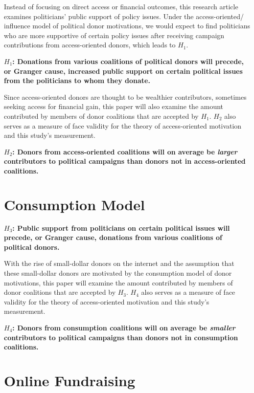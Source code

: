 \documentclass[12pt,]{article}
\begin{document}
Instead of focusing on direct access or financial outcomes, this
research article examines politicians' public support of policy issues.
Under the access-oriented/ influence model of political donor
motivations, we would expect to find politicians who are more supportive
of certain policy issues after receiving campaign contributions from
access-oriented donors, which leads to \(H_{1}\).

\textbf{\(H_{1}\): Donations from various coalitions of political donors
will precede, or Granger cause, increased public support on certain
political issues from the politicians to whom they donate.}

Since access-oriented donors are thought to be wealthier contributors,
sometimes seeking access for financial gain, this paper will also
examine the amount contributed by members of donor coalitions that are
accepted by \(H_{1}\). \(H_{2}\) also serves as a measure of face
validity for the theory of access-oriented motivation and this study's
measurement.

\textbf{\(H_{2}\): Donors from access-oriented coalitions will on
average be \emph{larger} contributors to political campaigns than donors
not in access-oriented coalitions.}

\hypertarget{consumption-model}{%
\section{Consumption Model}\label{consumption-model}}

\textbf{\(H_{3}\): Public support from politicians on certain political
issues will precede, or Granger cause, donations from various coalitions
of political donors.}

With the rise of small-dollar donors on the internet and the assumption
that these small-dollar donors are motivated by the consumption model of
donor motivations, this paper will examine the amount contributed by
members of donor coalitions that are accepted by \(H_{3}\). \(H_{4}\)
also serves as a measure of face validity for the theory of
access-oriented motivation and this study's measurement.

\textbf{\(H_{4}\): Donors from consumption coalitions will on average be
\emph{smaller} contributors to political campaigns than donors not in
consumption coalitions.}

\hypertarget{online-fundraising}{%
\section{Online Fundraising}\label{online-fundraising}}
\end{document}
